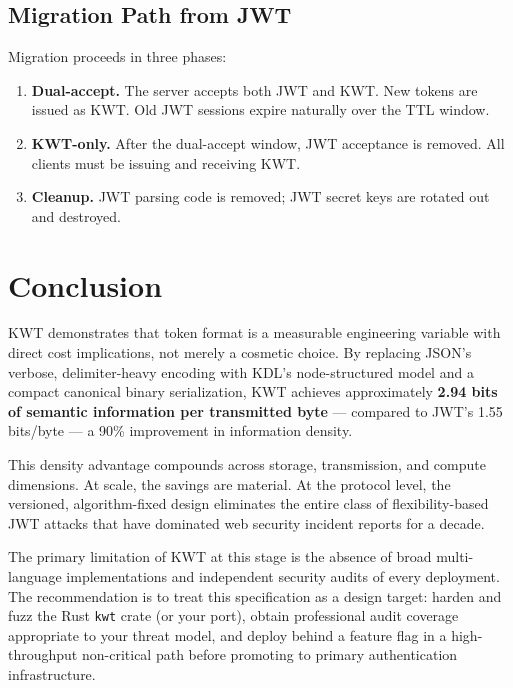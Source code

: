 \documentclass[11pt, letterpaper]{article}
\begin{document}
\subsection{Migration Path from JWT}

Migration proceeds in three phases:

\begin{enumerate}
  \item \textbf{Dual-accept.} The server accepts both JWT and KWT. New tokens
        are issued as KWT. Old JWT sessions expire naturally over the TTL window.
  \item \textbf{KWT-only.} After the dual-accept window, JWT acceptance is
        removed. All clients must be issuing and receiving KWT.
  \item \textbf{Cleanup.} JWT parsing code is removed; JWT secret keys are
        rotated out and destroyed.
\end{enumerate}

\section{Conclusion}

KWT demonstrates that token format is a measurable engineering variable with
direct cost implications, not merely a cosmetic choice.
By replacing JSON's verbose, delimiter-heavy encoding with KDL's node-structured
model and a compact canonical binary serialization, KWT achieves approximately
\textbf{2.94 bits of semantic information per transmitted byte} —
compared to JWT's 1.55 bits/byte — a 90\% improvement in information density.

This density advantage compounds across storage, transmission, and compute
dimensions. At scale, the savings are material. At the protocol level, the
versioned, algorithm-fixed design eliminates the entire class of
flexibility-based JWT attacks that have dominated web security incident
reports for a decade.

The primary limitation of KWT at this stage is the absence of broad
multi-language implementations and independent security audits of every
deployment. The recommendation is to treat this specification as a design target:
harden and fuzz the Rust \texttt{kwt} crate (or your port), obtain professional
audit coverage appropriate to your threat model, and deploy behind a feature
flag in a high-throughput non-critical path before promoting to primary
authentication infrastructure.
\end{document}
